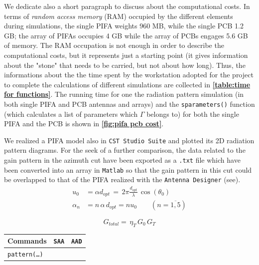 \documentclass[10 pt,a4paper,twocolumn]{article}
\begin{document}
{We dedicate also a short  paragraph to discuss about the computational costs. In terms of \emph{random access memory} (RAM) occupied by the different elements during simulations, the single PIFA weights 960 MB, while the single PCB 1.2 GB; the array of PIFAs occupies 4 GB while the array of PCBs engages 5.6 GB of memory. The RAM occupation is not enough in order to describe the computational costs, but it represents just a starting point (it gives information about the "stone" that needs to be carried, but not about how long). Thus, the informations about the the time spent by the workstation adopted for the project to complete the calculations of different simulations are collected in \textbf{\cref{table:time for functions}}. The running time for one the radiation pattern simulation (in both single PIFA and PCB antennas and arrays) and the \texttt{sparameters()} function (which calculates a list of parameters which $\Gamma$ belongs to) for both the single PIFA and the PCB is shown in \textbf{\cref{fig:pifa pcb cost}}. 

We realized a PIFA model also in \texttt{\color{Periwinkle}CST Studio Suite} and plotted its 2D radiation pattern diagrams. For the seek of a further comparison, the data related to the gain pattern in the azimuth cut have been exported as a \texttt{.txt} file which have been converted into an array in \texttt{\color{BurntOrange}Matlab} so that the gain pattern in this cut could be overlapped to that of the PIFA realized with the \texttt{\color{Mahogany}Antenna Designer} (see).
\begin{equation}
	\begin{aligned}
		u_0&=\alpha d_{opt}\,=\,2\pi\frac{d_{opt}}{\lambda}\,\cos(\theta_0)\\
		\alpha_n&=n\,\alpha\,d_{opt}=nu_0\qquad \left(n=\overline{1,5}\right)
		\label{eq:phase coefficients}
	\end{aligned}
\end{equation}

\begin{equation}
	G_{total}=\,\eta_T\,G_0\,G_T
	\label{eq:pattern multiplication}
\end{equation}
\begin{table}[bt!]
	\begin{center}
	{\selectfont
		\begin{tabular}{|m{15.5cm}|c|c|}
			\hline
			\cellcolor{deepsaffron}\textbf{Commands} & \cellcolor{flax}\texttt{\color{Mahogany}SAA} & \cellcolor{flax}\texttt{\color{Mahogany}AAD} \\
			\hline
		 \colorbox{backcolour}{\texttt{pattern(\dots)}}
			

\end{tabular}}
\end{center}
\end{table}}
\end{document}
